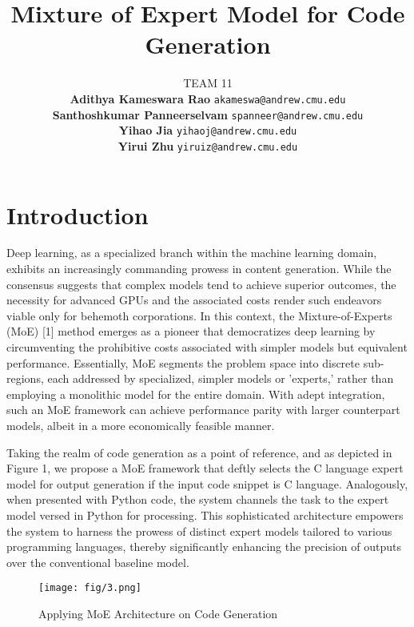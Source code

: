 \documentclass{article}
\title{Mixture of Expert Model for Code Generation}
\author{
TEAM 11 \\
\textbf{Adithya Kameswara Rao}
\texttt{akameswa@andrew.cmu.edu} \\
\textbf{Santhoshkumar Panneerselvam}
\texttt{spanneer@andrew.cmu.edu} \\
\textbf{Yihao Jia}
\texttt{yihaoj@andrew.cmu.edu} \\
\textbf{Yirui Zhu}
\texttt{yiruiz@andrew.cmu.edu} \\ 
}
\begin{document}
	\maketitle
	\vspace{-1.5em}
	\section{Introduction}

	Deep learning, as a specialized branch within the machine learning domain,
	exhibits an increasingly commanding prowess in content generation. While the consensus
	suggests that complex models tend to achieve superior outcomes, the necessity
	for advanced GPUs and the associated costs render such endeavors viable only
	for behemoth corporations. In this context, the Mixture-of-Experts (MoE) [1]
	method emerges as a pioneer that democratizes deep learning by circumventing
	the prohibitive costs associated with simpler models but equivalent
	performance. Essentially, MoE segments the problem space into discrete sub-regions,
	each addressed by specialized, simpler models or 'experts,' rather than employing
	a monolithic model for the entire domain. With adept integration, such an MoE framework
	can achieve performance parity with larger counterpart models, albeit in a
	more economically feasible manner.

	Taking the realm of code generation as a point of reference, and as depicted in
	Figure 1, we propose a MoE framework that deftly selects the C language expert
	model for output generation if the input code snippet is C language. Analogously,
	when presented with Python code, the system channels the task to the expert model
	versed in Python for processing. This sophisticated architecture empowers the
	system to harness the prowess of distinct expert models tailored to various
	programming languages, thereby significantly enhancing the precision of outputs
	over the conventional baseline model.

	\begin{figure}[htbp]
		\centering
		\texttt{[image: fig/3.png]}
		\caption{Applying MoE Architecture on Code Generation}
		\label{fig:flow3}
	\end{figure}
\end{document}
